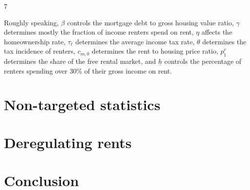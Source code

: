 7\documentclass[parskip=full]{article}
\begin{document}
Roughly speaking, $\beta$ controls the mortgage debt to gross housing value ratio, $\gamma$ determines mostly the fraction of income renters spend on rent, $\eta$ affects the homeownership rate, $\tau_{\ell}$ determines the average income tax rate, $\theta$ determines the tax incidence of renters, $c_{m,0}$ determines the rent to housing price ratio, $p^{r}_{1}$ determines the share of the free rental market, and $\underline{h}$ controls the percentage of renters spending over 30\% of their gross income on rent.

\section{Non-targeted statistics}

\section{Deregulating rents}

\section{Conclusion}



\linespread{1.5}





\end{document}
